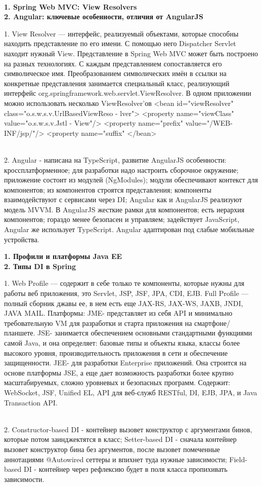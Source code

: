 \documentclass{article}
\newcommand{\bil}[4]{%
    \begin{minipage}{.3\textwidth}
        \textbf{1. #1} \\
        \textbf{2. #2}

        1. #3
        \\
        2. #4
    \end{minipage}
}
\begin{document}
\\
\bil{Spring Web MVC: View Resolvers}{Angular: ключевые особенности, отличия от AngularJS}{
    View Resolver — интерфейс, реализуемый объектами, которые способны находить представление по его имени. 
    С помощью него Dispatcher Servlet находит нужный View.
    Представление в Spring Web MVC может быть построено на разных технологиях.
    С каждым представлением сопоставляется его символическое имя.
    Преобразованием символических имён в ссылки на конкретные представления занимается специальный класс, реализующий интерфейс org.springframework.web.servlet.ViewResolver.
    В одном приложении можно использовать несколько ViewResolver'ов
    <bean id="viewResolver" class="o.s.w.s.v.UrlBasedViewReso - lver"> <property name="viewClass"
              value="o.s.w.s.v.Jstl - View"/>
    <property name="prefix"
              value="/WEB-INF/jsp/"/>
    <property name="suffix"
</bean>
}{
    Angular - написана на TypeScript, развитие AngularJS
    особенности:
    кроссплатформенное;
    для разработки надо настроить сборочное окружение;
    приложение состоит из модулей (NgModules);
    модули обеспечивают контекст для компонентов;
    из компонентов строятся представления;
    компоненты взаимодействуют с сервисами через DI;
    Angular как и AngularJS реализуют модель MVVM.
    В AngularJS жесткие рамки для компонентов; есть иерархия компонентов; гораздо менее безопасен и управляем; задействует JavaScript, Angular же использует TypeScript.
    Angular адаптирован под слабые мобильные устройства.

}
\hfill
\bil{Профили и платформы Java EE}{Типы DI в Spring}{
    Web Profile — содержит в себе только те компоненты, которые нужны для работы веб приложения, это Servlet, JSP, JSF, JPA, CDI, EJB.
Full Profile — полный сборник джавы ее, в нем есть еще JAX-RS, JAX-WS, JAXB, JNDI, JAVA MAIL.
Платформы: JME- представляет из себя API и минимально требовательную VM для разработки и старта приложения на смартфоне/планшете. JSE- занимается обеспечением основными стандартными функциями самой Java, и она определяет: базовые типы и объекты языка, классы более высокого уровня, 
производительность приложения в сети и обеспечение защищенности.
JEE- для разработки Enterprise приложений. Она строится на основе платформы JSE, а еще дает возможность разработки более крупно масштабируемых, сложно уровневых и безопасных программ. Содержит: WebSocket, JSF, Unified EL, API для веб-служб RESTful, DI, EJB, JPA, и Java Transaction API.
}{
    Constructor-based DI - контейнер вызовет конструктор с аргументами бинов, которые потом заинджектятся в класс; Setter-based DI - сначала контейнер вызовет конструктор бина без аргументов, после вызовет помеченные аннотациями @Autowired сеттеры и впихнет туда нужные зависимости; 
    Field-based DI - контейнер через рефлексию будет в поля класса пропихивать зависимости.
}
\end{document}
